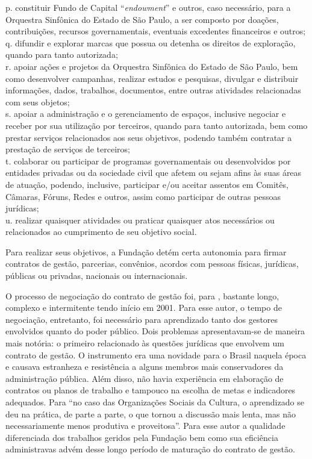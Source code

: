 \documentclass[a4paper, 12pt, openright, oneside, german, french, english, brazil]{abntex2}
\begin{document}
\begin{citacao}
		p. constituir Fundo de Capital ``\textit{endowment}'' e outros, caso necessário, para a Orquestra Sinfônica do Estado de São Paulo, a ser composto por doações, contribuições, recursos governamentais, eventuais excedentes financeiros e outros;\\
		q. difundir e explorar marcas que possua ou detenha os direitos de exploração, quando para tanto autorizada;\\
		r. apoiar ações e projetos da Orquestra Sinfônica do Estado de São Paulo, bem como desenvolver campanhas, realizar estudos e pesquisas, divulgar e distribuir informações, dados, trabalhos, documentos, entre outras atividades relacionadas com seus objetos;\\
		s. apoiar a administração e o gerenciamento de espaços, inclusive negociar e receber por sua utilização por terceiros, quando para tanto autorizada, bem como prestar serviços relacionados aos seus objetivos, podendo também contratar a prestação de serviços de terceiros;\\
		t. colaborar ou participar de programas governamentais ou desenvolvidos por entidades privadas ou da sociedade civil que afetem ou sejam afins às suas áreas de atuação, podendo, inclusive, participar e/ou aceitar assentos em Comitês, Câmaras, Fóruns, Redes e outros, assim como participar de outras pessoas jurídicas;\\
		u. realizar quaisquer atividades ou praticar quaisquer atos necessários ou relacionados ao cumprimento de seu objetivo social.
		\cite[p. 2]{osesp2013estatuto}
	\end{citacao}
	
	Para realizar seus objetivos, a Fundação detém certa autonomia para firmar contratos de gestão, parcerias, convênios, acordos com pessoas físicas, jurídicas, públicas ou privadas, nacionais ou internacionais. 
	
	O processo de negociação do contrato de gestão foi, para , bastante longo, complexo e intermitente tendo início em 2001. Para esse autor, o tempo de negociação, entretanto, foi necessário para aprendizado tanto dos gestores envolvidos quanto do poder público. Dois problemas apresentavam-se de maneira mais notória: o primeiro relacionado às questões jurídicas que envolvem um contrato de gestão. O instrumento era uma novidade para o Brasil naquela época e causava estranheza e resistência a alguns membros mais conservadores da administração pública. Além disso, não havia experiência em elaboração de contratos ou planos de trabalho e tampouco na escolha de metas e indicadores adequados. Para  ``no caso das Organizações Sociais da Cultura, o aprendizado se deu na prática, de parte a parte, o que tornou a discussão mais lenta, mas não necessariamente menos produtiva e proveitosa''. Para esse autor a qualidade diferenciada dos trabalhos geridos pela Fundação bem como sua eficiência administravas advém desse longo período de maturação do contrato de gestão.
	
\end{document}
